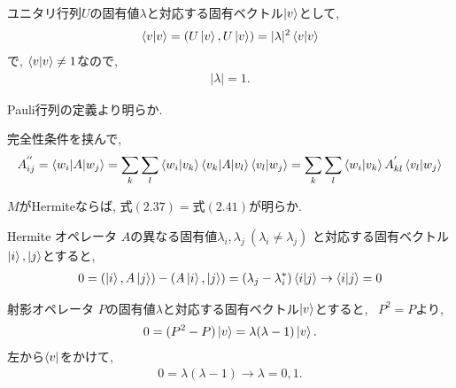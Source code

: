 \begin{ex}
    \label{ex2.18}
    ユニタリ行列$U$の固有値$\lambda$と対応する固有ベクトル$\ket{v}$として,
    \begin{align*}
        \braket{v|v} = \left( U \ket{v}, U \ket{v} \right) = |\lambda|^2 \braket{v|v}
    \end{align*}
    で, $\braket{v|v}\neq 1$なので,
    \begin{align*}
        |\lambda| = 1.
    \end{align*}
\end{ex}

\begin{ex}
    \label{ex2.19}
    Pauli行列の定義より明らか.
\end{ex}

\begin{ex}
    \label{ex2.20}
    完全性条件を挟んで,
    \begin{align*}
        A_{ij}^{''}
        = \braket{w_i|A|w_j}
        = \sum_k \sum_l \braket{w_i|v_k}\braket{v_k|A|v_l}\braket{v_l|w_j}
        = \sum_k \sum_l \braket{w_i|v_k}A_{kl}^{'}\braket{v_l|w_j}
    \end{align*}
\end{ex}

\begin{ex}
    \label{ex2.21}
    $M$がHermiteならば, $\mathrm{式}(2.37)=\mathrm{式}(2.41)$が明らか.
\end{ex}


\begin{ex}
    \label{ex2.22}
    Hermite オペレータ $A$の異なる固有値$\lambda_i, \lambda_j \ (\lambda_i \neq \lambda_j)$
    と対応する固有ベクトル$\ket{i}, \ket{j}$とすると,
    \begin{align*}
        0 = \left(\ket{i}, A \ket{j} \right) - \left( A \ket{i}, \ket{j} \right) = (\lambda_j - \lambda_i^*) \braket{i|j}
        \to
        \braket{i|j} = 0
    \end{align*}
\end{ex}

\begin{ex}
    \label{ex2.23}
    射影オペレータ $P$の固有値$\lambda$と対応する固有ベクトル$\ket{v}$とすると, \ $P^2=P$より,
    \begin{align*}
        0 = (P^2 - P)\ket{v} = \lambda(\lambda-1)\ket{v}.
    \end{align*}
    左から$\bra{v}$をかけて,
    \begin{align*}
        0 = \lambda(\lambda-1) \to \lambda = 0,1.
    \end{align*}
\end{ex}

